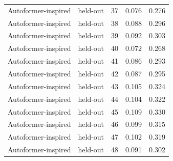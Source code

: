 \begin{tabular}{llrrr}
Autoformer-inspired & held-out & 37 & 0.076 & 0.276 \\
Autoformer-inspired & held-out & 38 & 0.088 & 0.296 \\
Autoformer-inspired & held-out & 39 & 0.092 & 0.303 \\
Autoformer-inspired & held-out & 40 & 0.072 & 0.268 \\
Autoformer-inspired & held-out & 41 & 0.086 & 0.293 \\
Autoformer-inspired & held-out & 42 & 0.087 & 0.295 \\
Autoformer-inspired & held-out & 43 & 0.105 & 0.324 \\
Autoformer-inspired & held-out & 44 & 0.104 & 0.322 \\
Autoformer-inspired & held-out & 45 & 0.109 & 0.330 \\
Autoformer-inspired & held-out & 46 & 0.099 & 0.315 \\
Autoformer-inspired & held-out & 47 & 0.102 & 0.319 \\
Autoformer-inspired & held-out & 48 & 0.091 & 0.302 \\
\bottomrule
\end{tabular}
